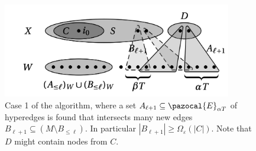 \begin{figure}
\begin{center}
    \includegraphics[width=10cm]{chapters/santaclaus/SC_fig2.png}
    \caption{Case 1 of the algorithm, 
    where a set $A_{\ell+1} \subseteq \pazocal{E}_{\alpha T}$ of hyperedges is found that intersects many new edges $
    B_{\ell+1} \subseteq (M \setminus B_{\leq \ell})$. In particular $|B_{\ell+1}| \geq \Omega_{\varepsilon}(|C|)$. 
    Note that $D$ might contain nodes from $C$.\label{fig:CaseIofTheAlgorithm}}
\end{center}
\end{figure}

